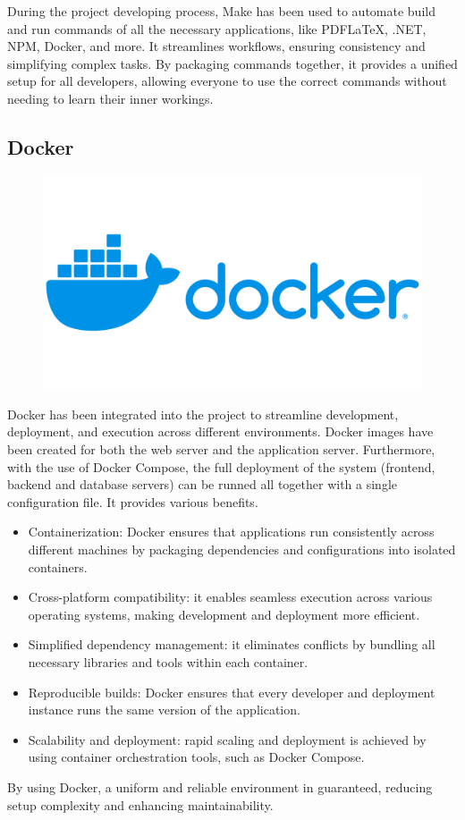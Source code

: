 During the project developing process, Make has been used to automate build and run commands of all the necessary applications, like PDFLaTeX, .NET, NPM, Docker, and more.
It streamlines workflows, ensuring consistency and simplifying complex tasks.
By packaging commands together, it provides a unified setup for all developers, allowing everyone to use the correct commands without needing to learn their inner workings.

\subsection{Docker}

\begin{figure}[H]
    \hfill
    \includegraphics[width=0.1\linewidth]{../assets/tools-logos/docker.png}
    \hspace{1cm}
\end{figure}

Docker has been integrated into the project to streamline development, deployment, and execution across different environments.
Docker images have been created for both the web server and the application server.
Furthermore, with the use of Docker Compose, the full deployment of the system (frontend, backend and database servers) can be runned all together with a single configuration file.
It provides various benefits.

\begin{itemize}

    \item Containerization: Docker ensures that applications run consistently across different machines by packaging dependencies and configurations into isolated containers.
    \item Cross-platform compatibility: it enables seamless execution across various operating systems, making development and deployment more efficient.
    \item Simplified dependency management: it eliminates conflicts by bundling all necessary libraries and tools within each container.
    \item Reproducible builds: Docker ensures that every developer and deployment instance runs the same version of the application.
    \item Scalability and deployment: rapid scaling and deployment is achieved by using container orchestration tools, such as Docker Compose.

\end{itemize}

By using Docker, a uniform and reliable environment in guaranteed, reducing setup complexity and enhancing maintainability.
